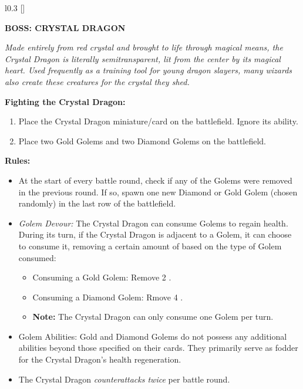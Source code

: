 \begin{wrapfigure}{l}{0.3\textwidth}
  \raisebox{0pt}[\dimexpr{}\baselineskip\relax]{}
\end{wrapfigure}
{
  \textbf{\MakeUppercase{Boss: Crystal Dragon}}

  \medskip

  \textit{Made entirely from red crystal and brought to life through magical means, the Crystal Dragon is literally semitransparent, lit from the center by its magical heart.
    Used frequently as a training tool for young dragon slayers, many wizards also create these creatures for the crystal they shed.
  }

  \medskip

  \textbf{Fighting the Crystal Dragon:}
  \begin{enumerate}
    \item Place the Crystal Dragon miniature/card on the battlefield.
      Ignore its ability.
    \item Place two Gold Golems and two Diamond Golems on the battlefield.
  \end{enumerate}

  \medskip

  \textbf{Rules:}
  \begin{itemize}
    \item At the start of every battle round, check if any of the Golems were removed in the previous round.
      If so, spawn one new Diamond or Gold Golem (chosen randomly) in the last row of the battlefield.
    \item \textit{Golem Devour:} The Crystal Dragon can consume Golems to regain health.
      During its turn, if the Crystal Dragon is adjacent to a Golem, it can choose to consume it, removing a certain amount of  based on the type of Golem consumed:
      \begin{itemize}
        \item Consuming a Gold Golem: Remove 2 .
        \item Consuming a Diamond Golem: Rmove 4 .
        \item[] \textbf{Note:} The Crystal Dragon can only consume one Golem per turn.
      \end{itemize}
    \item Golem Abilities: Gold and Diamond Golems do not possess any additional abilities beyond those specified on their cards.
      They primarily serve as fodder for the Crystal Dragon's health regeneration.
    \item The Crystal Dragon \textit{counterattacks twice} per battle round.
  \end{itemize}
}

